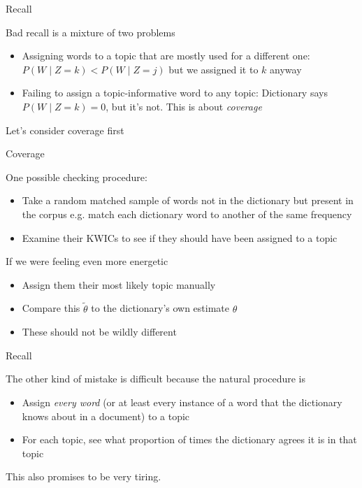 \documentclass{hertieteaching}
\begin{document}
\begin{frame}{Recall}

Bad recall is a mixture of two problems
\begin{itemize}
  \item Assigning words to a topic that are mostly used for a different one: $P(W \mid Z=k)<P(W \mid Z=j)$ but we assigned it to $k$ anyway
  \item Failing to assign a topic-informative word to any topic: Dictionary says $P(W \mid Z=k)=0$, but it's not. This is about \textit{coverage}
\end{itemize}

Let's consider coverage first

\end{frame}
\begin{frame}{Coverage}

One possible checking procedure:
\begin{itemize}
  \item Take a random matched sample of words not in the dictionary but present in the corpus e.g. match each dictionary word to another of the same frequency
  \item Examine their KWICs to see if they should have been assigned to a topic
\end{itemize}
If we were feeling even more energetic
\begin{itemize}
  \item Assign them their most likely topic manually
  \item Compare this $\tilde{\theta}$ to the dictionary's own estimate $\theta$
  \item These should not be wildly different
\end{itemize}
  
\end{frame}

\begin{frame}{Recall}

The other kind of mistake is difficult because the natural procedure is
\begin{itemize}
  \item Assign \textit{every word} (or at least every instance of a word that the dictionary knows about in a document) to a topic
  \item For each topic, see what proportion of times  the dictionary agrees it is in that topic
\end{itemize}
This also promises to be very tiring.

\end{frame}
\end{document}
